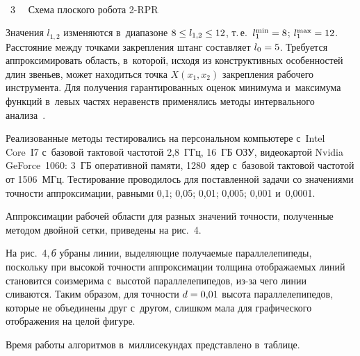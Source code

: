 \begin{multicols}{2}
{ \begin{center}  %
 \vspace*{-2pt}
    \mbox{%
 \epsfxsize=79mm 
 }

\vspace*{6pt}

\noindent
{{\figurename~3}\ \ \small{
Схема плоского робота 2-RPR
}}
\end{center}}


\vspace*{6pt}


\noindent
Значения $l_{1,2}$ изменяются в~диапазоне $8\hm\leq l_{1,2}\hm\leq 12$, т.\,е.\ 
$l_1^{\min}\hm= 8$; $l_1^{\max}\hm=12$. Расстояние между точками 
закрепления штанг составляет $l_0\hm=5$. Требуется аппроксимировать 
область, в~которой, исходя из конструктивных особенностей длин звеньев, 
может находиться точка $X(x_1,x_2)$ закрепления рабочего инструмента. Для 
получения гарантированных оценок минимума и~максимума функций в~левых 
частях неравенств применялись методы интервального  
анализа~\cite{4-pos, 5-pos}.
     
     Реализованные методы тестировались на персональном компьютере 
с~Intel Core~I7 с~базовой тактовой частотой 2,8~ГГц, 16~ГБ ОЗУ, видеокартой 
Nvidia GeForce~1060: 3~ГБ оперативной памяти, 1280~ядер с~базовой тактовой 
частотой от 1506~МГц. Тестирование проводилось для поставленной задачи со 
значениями точности аппроксимации, равными 0,1; 0,05; 0,01; 0,005; 0,001 
и~0,0001.
     
     Аппроксимации рабочей области для разных значений точности, 
полученные методом двойной сетки, приведены на рис.~4.




На рис.~4,\,\textit{б} убраны линии, выделяющие получаемые параллелепипеды, 
поскольку при высокой точности аппроксимации толщина отображаемых 
линий становится соизмерима с~высотой параллелепипедов, из-за чего линии 
сливаются. Таким образом, для точности $d\hm=0{,}01$ высота 
параллелепипедов, которые не объединены друг с~другом, слишком мала для 
графического отображения на целой фигуре. 
     
Время работы алгоритмов в~миллисекундах представлено в~таблице.





\end{multicols}
